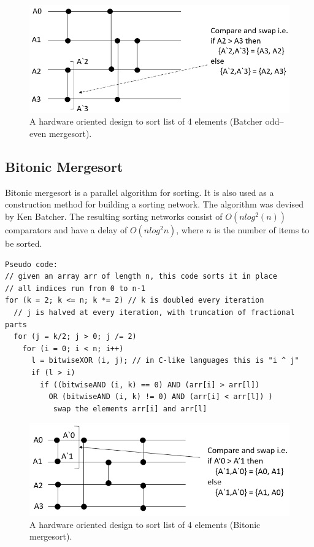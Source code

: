 \documentclass{article}
\begin{document}
\begin{figure}[H]
\centering
\includegraphics[width=1.00\textwidth]{odd_even_nwk.PNG}
\caption{\label{fig:odd_even_nwk}A hardware oriented design to sort list of 4 elements (Batcher odd–even mergesort).}
\end{figure}

\subsection{Bitonic Mergesort}
\label{subsec:Bitonic Mergesort}


Bitonic mergesort is a parallel algorithm for sorting\cite{wiki:002}. It is also used as a construction method for building a sorting network. The algorithm was devised by Ken Batcher. The resulting sorting networks consist of  $O(nlog^2(n))$ comparators and have a delay of $O(nlog^2n)$, where $n$ is the number of items to be sorted.

\begin{lstlisting}
Pseudo code:
// given an array arr of length n, this code sorts it in place
// all indices run from 0 to n-1
for (k = 2; k <= n; k *= 2) // k is doubled every iteration
  // j is halved at every iteration, with truncation of fractional parts
  for (j = k/2; j > 0; j /= 2) 
    for (i = 0; i < n; i++)
      l = bitwiseXOR (i, j); // in C-like languages this is "i ^ j"
      if (l > i)
        if ((bitwiseAND (i, k) == 0) AND (arr[i] > arr[l])
          OR (bitwiseAND (i, k) != 0) AND (arr[i] < arr[l]) )
           swap the elements arr[i] and arr[l]
\end{lstlisting}

\begin{figure}[H]
\centering
\includegraphics[width=1.00\textwidth]{bitonic_nwk.PNG}
\caption{\label{fig:bitonic_nwk}A hardware oriented design to sort list of 4 elements (Bitonic mergesort).}
\end{figure}
\end{document}
